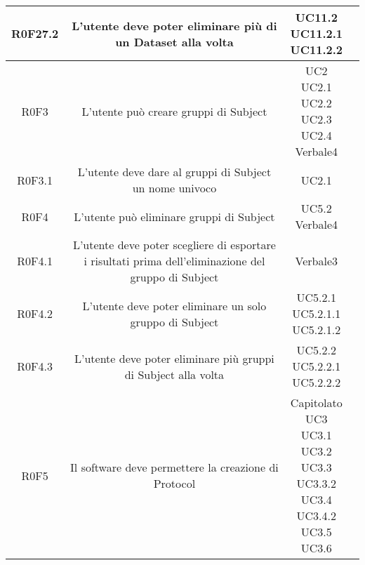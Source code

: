 \begin{center}
\begin{longtable}{|c|c|c|c|}
\hline
R0F27.2   & \parbox[t]{\larghezza}{L'utente deve poter eliminare più di un Dataset\glossario{} alla volta}  & \parbox[t]{\dimFonti}{ UC11.2 \\ UC11.2.1 \\ UC11.2.2 \\} \\
\hline
R0F3   & \parbox[t]{\larghezza}{L'utente può creare gruppi di Subject\glossario{}}  & \parbox[t]{\dimFonti}{ UC2 \\ UC2.1 \\ UC2.2 \\ UC2.3 \\ UC2.4 \\ Verbale4 \\} \\
\hline
R0F3.1   & \parbox[t]{\larghezza}{L'utente deve dare al gruppi di Subject\glossario{} un nome univoco}  & \parbox[t]{\dimFonti}{ UC2.1 \\} \\
\hline
R0F4   & \parbox[t]{\larghezza}{L'utente può eliminare gruppi di Subject\glossario{}}  & \parbox[t]{\dimFonti}{ UC5.2 \\ Verbale4 \\} \\
\hline
R0F4.1   & \parbox[t]{\larghezza}{L'utente deve poter scegliere di esportare i risultati prima dell'eliminazione del gruppo di Subject\glossario{}}  & \parbox[t]{\dimFonti}{ Verbale3 \\} \\
\hline
R0F4.2   & \parbox[t]{\larghezza}{L'utente deve poter eliminare un solo gruppo di Subject\glossario{}}  & \parbox[t]{\dimFonti}{ UC5.2.1 \\ UC5.2.1.1 \\ UC5.2.1.2 \\} \\
\hline
R0F4.3   & \parbox[t]{\larghezza}{L'utente deve poter eliminare più gruppi di Subject\glossario{} alla volta}  & \parbox[t]{\dimFonti}{ UC5.2.2 \\ UC5.2.2.1 \\ UC5.2.2.2 \\} \\
\hline
R0F5   & \parbox[t]{\larghezza}{Il software deve permettere la creazione di Protocol\glossario{}}  & \parbox[t]{\dimFonti}{ Capitolato \\ UC3 \\ UC3.1 \\ UC3.2 \\ UC3.3 \\ UC3.3.2 \\ UC3.4 \\ UC3.4.2 \\ UC3.5 \\ UC3.6 \\} \\

\end{longtable}
\end{center}
